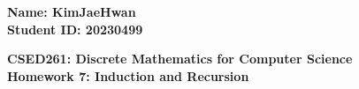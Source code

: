 \documentclass{article}%
\theoremstyle{definition}
\begin{document}
\begin{flushright}
\textbf{Name: KimJaeHwan\;\\
Student ID: 20230499 }
\end{flushright}

\begin{center}
\textbf{CSED261: Discrete Mathematics for Computer Science \\
Homework 7: Induction and Recursion} \\
\end{center}









\end{document}
